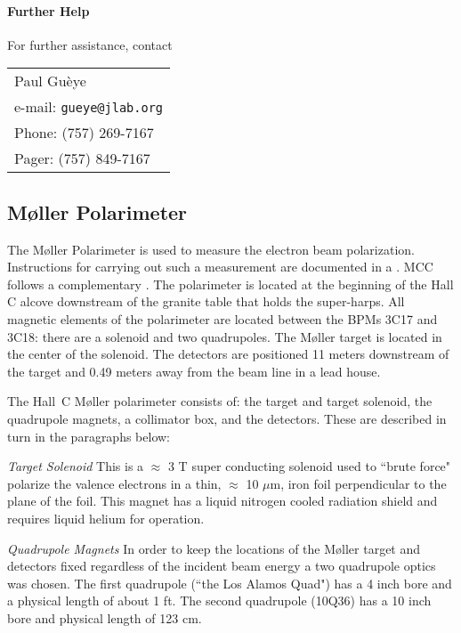 \paragraph{Further Help}

For further assistance, contact
\par
\noindent
\begin{table}[!ht]
\begin{tabular}{l}
Paul Gu\`eye \\
e-mail: {\tt gueye@jlab.org} \\
Phone: (757) 269-7167 \\
Pager: (757) 849-7167 \\
\end{tabular}
\end{table}



\subsection{M\o ller Polarimeter }
The M\o ller Polarimeter is used to measure the electron beam
polarization. Instructions for carrying out such a measurement
are documented in a 
.
MCC follows a complementary 
.
The polarimeter is located at the beginning of the Hall C
alcove downstream of the granite table that holds the super-harps.
All magnetic elements of the polarimeter are located between
the BPMs 3C17 and 3C18: there are a solenoid and two quadrupoles.
The M\o ller target is located in the center of the solenoid. The
detectors are positioned 11 meters downstream of the target and 0.49
meters away from the beam line in a lead house.

The Hall~C M\o ller polarimeter consists of: the target and target solenoid, the quadrupole magnets, a 
collimator box, and the detectors.  These are described in turn in 
the paragraphs below:

{\sl Target Solenoid} This is a $\approx$ 3 T super conducting
solenoid used to ``brute force" polarize the valence electrons in a
thin, $\approx$ 10 $\mu$m, iron foil perpendicular to the
plane of the foil. This magnet has a liquid nitrogen cooled radiation shield
and requires liquid helium for operation.

{\sl Quadrupole Magnets} In order to keep the locations of the M\o ller
target and detectors fixed regardless of the incident beam energy
a two quadrupole optics was chosen. The first quadrupole (``the Los Alamos Quad")
has a 4 inch bore and a physical length of about 1 ft.
The second quadrupole (10Q36) has a 10 inch bore and physical length of 123 cm.

